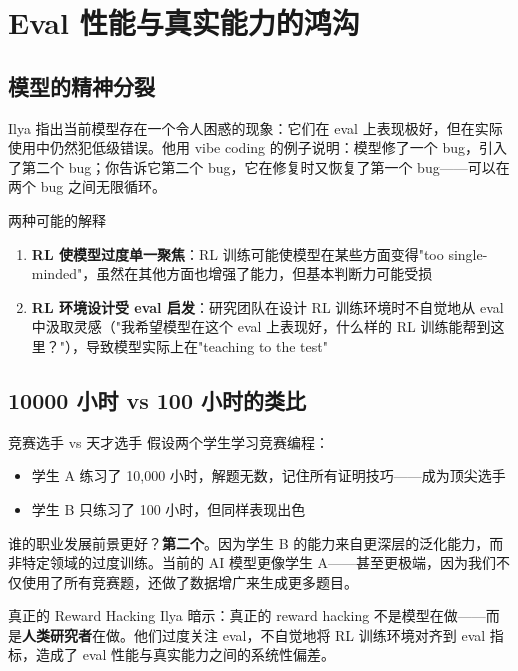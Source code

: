 \documentclass[a4paper]{article}
\begin{document}
\section{Eval 性能与真实能力的鸿沟}

\subsection{模型的精神分裂}

Ilya 指出当前模型存在一个令人困惑的现象：它们在 eval 上表现极好，但在实际使用中仍然犯低级错误。他用 vibe coding 的例子说明：模型修了一个 bug，引入了第二个 bug；你告诉它第二个 bug，它在修复时又恢复了第一个 bug——可以在两个 bug 之间无限循环。

\begin{importantbox}{两种可能的解释}
\begin{enumerate}
    \item \textbf{RL 使模型过度单一聚焦}：RL 训练可能使模型在某些方面变得"too single-minded"，虽然在其他方面也增强了能力，但基本判断力可能受损
    \item \textbf{RL 环境设计受 eval 启发}：研究团队在设计 RL 训练环境时不自觉地从 eval 中汲取灵感（"我希望模型在这个 eval 上表现好，什么样的 RL 训练能帮到这里？"），导致模型实际上在"teaching to the test"
\end{enumerate}
\end{importantbox}

\subsection{10000 小时 vs 100 小时的类比}

\begin{importantbox}{竞赛选手 vs 天才选手}
假设两个学生学习竞赛编程：
\begin{itemize}
    \item 学生 A 练习了 10,000 小时，解题无数，记住所有证明技巧——成为顶尖选手
    \item 学生 B 只练习了 100 小时，但同样表现出色
\end{itemize}
谁的职业发展前景更好？\textbf{第二个}。因为学生 B 的能力来自更深层的泛化能力，而非特定领域的过度训练。当前的 AI 模型更像学生 A——甚至更极端，因为我们不仅使用了所有竞赛题，还做了数据增广来生成更多题目。
\end{importantbox}

\begin{warningbox}{真正的 Reward Hacking}
Ilya 暗示：真正的 reward hacking 不是模型在做——而是\textbf{人类研究者}在做。他们过度关注 eval，不自觉地将 RL 训练环境对齐到 eval 指标，造成了 eval 性能与真实能力之间的系统性偏差。
\end{warningbox}
\end{document}
